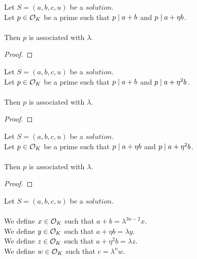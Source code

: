 \begin{lemma}
    \label{lmm:associated_of_dvd_a_add_b_of_dvd_a_add_eta_mul_b}
    \leanok
    Let $S=(a, b, c, u)$ be a $solution$.\\
    Let $p \in \mathcal{O}_K$ be a prime such that $p \mid a+b$
    and $p \mid a+\eta  b$.\\\\
    Then $p$ is associated with $\lambda$.
\end{lemma}
\begin{proof}
    \leanok
\end{proof}

\begin{lemma}
    \label{lmm:associated_of_dvd_a_add_b_of_dvd_a_add_eta_sq_mul_b}
    \leanok
    Let $S=(a, b, c, u)$ be a $solution$.\\
    Let $p \in \mathcal{O}_K$ be a prime such that $p \mid a+b$
    and $p \mid a+\eta^2  b$.\\\\
    Then $p$ is associated with $\lambda$.
\end{lemma}
\begin{proof}
    \leanok
\end{proof}

\begin{lemma}
    \label{lmm:associated_of_dvd_a_add_eta_mul_b_of_dvd_a_add_eta_sq_mul_b}
    \leanok
    Let $S=(a, b, c, u)$ be a $solution$.\\
    Let $p \in \mathcal{O}_K$ be a prime such that $p \mid a+\eta  b$
    and $p \mid a+\eta^2  b$.\\\\
    Then $p$ is associated with $\lambda$.
\end{lemma}
\begin{proof}
    \leanok
\end{proof}

\begin{definition}[$x,y,z,w$]
    \label{def:Solution_x_y_z_w}
    \leanok
    Let $S=(a, b, c, u)$ be a $solution$.\\\\
    We define $x \in \mathcal{O}_K$ such that $a + b = \lambda^{3n-2}  x$.\\
    We define $y \in \mathcal{O}_K$ such that $a + \eta  b = \lambda  y$.\\
    We define $z \in \mathcal{O}_K$ such that $a + \eta^2  b = \lambda  z$.\\
    We define $w \in \mathcal{O}_K$ such that $c = \lambda^n  w$.
\end{definition}

